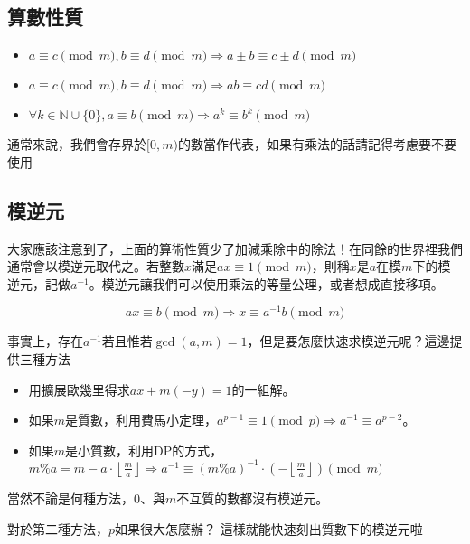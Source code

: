\subsection{算數性質}
\begin{itemize}
\item $a \equiv c \pmod m, b \equiv d \pmod m \Rightarrow a \pm b \equiv c \pm d \pmod m$
\item $a \equiv c \pmod m, b \equiv d \pmod m \Rightarrow ab \equiv cd \pmod m$
\item $\forall k \in \mathbb{N} \cup \{0\}, a \equiv b \pmod m \Rightarrow a^k \equiv b^k \pmod m$
\end{itemize}
通常來說，我們會存界於$[0, m)$的數當作代表，如果有乘法的話請記得考慮要不要使用

\subsection{模逆元}
大家應該注意到了，上面的算術性質少了加減乘除中的除法！在同餘的世界裡我們通常會以模逆元取代之。若整數$x$滿足$ax \equiv 1 \pmod m$，則稱$x$是$a$在模$m$下的模逆元，記做$a^{-1}$。模逆元讓我們可以使用乘法的等量公理，或者想成直接移項。

$$
ax \equiv b \pmod m \Rightarrow x \equiv a^{-1}b \pmod m
$$

事實上，存在$a^{-1}$若且惟若$\gcd(a,m)=1$，但是要怎麼快速求模逆元呢？這邊提供三種方法
\begin{itemize}
\item 用擴展歐幾里得求$ax + m(-y) = 1$的一組解。
\item 如果$m$是質數，利用費馬小定理，$a^{p-1} \equiv 1 \pmod p \Rightarrow a^{-1} \equiv a^{p-2}$。
\item 如果$m$是小質數，利用DP的方式，\\ $m \% a = m - a \cdot \left \lfloor \frac{m}{a} \right \rfloor \Rightarrow a^{-1} \equiv (m \% a)^{-1} \cdot (- \left \lfloor \frac{m}{a} \right \rfloor) \pmod m$
\end{itemize}
當然不論是何種方法，$0$、與$m$不互質的數都沒有模逆元。

對於第二種方法，$p$如果很大怎麼辦？
這樣就能快速刻出質數下的模逆元啦

